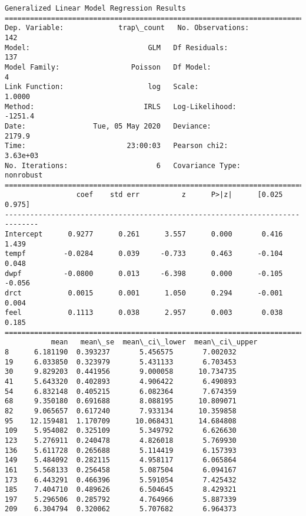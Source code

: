 \documentclass[11pt]{article}
\begin{document}
    \begin{Verbatim}[commandchars=\\\{\}]
                 Generalized Linear Model Regression Results                  
==============================================================================
Dep. Variable:             trap\_count   No. Observations:                  142
Model:                            GLM   Df Residuals:                      137
Model Family:                 Poisson   Df Model:                            4
Link Function:                    log   Scale:                          1.0000
Method:                          IRLS   Log-Likelihood:                -1251.4
Date:                Tue, 05 May 2020   Deviance:                       2179.9
Time:                        23:00:03   Pearson chi2:                 3.63e+03
No. Iterations:                     6   Covariance Type:             nonrobust
==============================================================================
                 coef    std err          z      P>|z|      [0.025      0.975]
------------------------------------------------------------------------------
Intercept      0.9277      0.261      3.557      0.000       0.416       1.439
tempf         -0.0284      0.039     -0.733      0.463      -0.104       0.048
dwpf          -0.0800      0.013     -6.398      0.000      -0.105      -0.056
drct           0.0015      0.001      1.050      0.294      -0.001       0.004
feel           0.1113      0.038      2.957      0.003       0.038       0.185
==============================================================================
           mean   mean\_se  mean\_ci\_lower  mean\_ci\_upper
8      6.181190  0.393237       5.456575       7.002032
19     6.033850  0.323979       5.431133       6.703453
30     9.829203  0.441956       9.000058      10.734735
41     5.643320  0.402893       4.906422       6.490893
54     6.832148  0.405215       6.082364       7.674359
68     9.350180  0.691688       8.088195      10.809071
82     9.065657  0.617240       7.933134      10.359858
95    12.159481  1.170709      10.068431      14.684808
109    5.954082  0.325109       5.349792       6.626630
123    5.276911  0.240478       4.826018       5.769930
136    5.611728  0.265688       5.114419       6.157393
149    5.484092  0.282115       4.958117       6.065864
161    5.568133  0.256458       5.087504       6.094167
173    6.443291  0.466396       5.591054       7.425432
185    7.404710  0.489626       6.504645       8.429321
197    5.296506  0.285792       4.764966       5.887339
209    6.304794  0.320062       5.707682       6.964373

\end{Verbatim}
\end{document}
